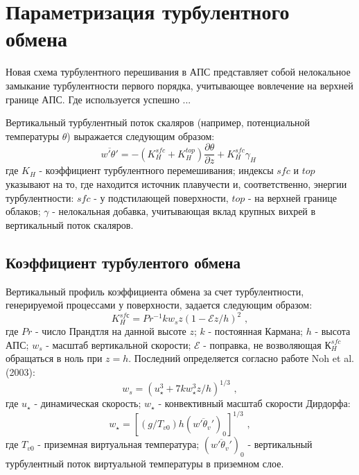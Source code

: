 \documentclass[12pt]{article}
\begin{document}
\section{Параметризация турбулентного обмена}

Новая схема турбулентного перешивания в АПС представляет собой нелокальное замыкание турбулентности первого порядка, учитывающее вовлечение на верхней границе АПС. Где используется успешно ...

Вертикальный турбулентный поток скаляров (например, потенциальной температуры $\theta$) выражается следующим образом:
%
\begin{equation}
\overline{w'\theta'} = - \left ( K_H^{sfc} + K_H^{top} \right ) \frac{\partial \theta}{\partial z} + K_H^{sfc} \gamma_{H} \,\,
\end{equation}
%
где $K_H$ - коэффициент турбулентного перемешивания; индексы $sfc$ и $top$ указывают на то, где находится источник плавучести и, соответственно, энергии турбулентности: $sfc$ - у подстилающей поверхности, $top$ - на верхней границе облаков; $\gamma$ - нелокальная добавка, учитывающая вклад крупных вихрей в вертикальный поток скаляров.

\subsection{Коэффициент турбулентого обмена}
 Вертикальный профиль коэффициента обмена за счет турбулентности, генерируемой процессами у поверхности, задается следующим образом:
%
\begin{equation}
K_{H}^{sfс} = Pr^{-1}kw_sz(1- \mathcal{E} z/h)^2 \,\, ,
\end{equation}
%
где $Pr$ - число Прандтля на данной высоте $z$; $k$ - постоянная Кармана; $h$ - высота АПС; $w_s$ - масштаб вертикальной скорости; $\mathcal{E}$ - поправка, не возволяющая $К_H^{sfc}$ обращаться в ноль при $z = h$. Последний определяется согласно работе Noh et al. (2003):
%
\begin{equation}
w_s = (u_{\star}^3 + 7kw_{\star}^3z/h)^{1/3} \,\, ,
\end{equation}
%
где $u_{\star}$ - динамическая скорость; $w_{\star}$ - конвективный масштаб скорости Дирдорфа:
%
\begin{equation}
w_{\star} = [(g/T_{v0})h(\overline{w'\theta_v'})_0]^{1/3} \,\, ,
\end{equation}
%
где $T_{v0}$ - приземная виртуальная температура; $(\overline{w'\theta_v'})_0$ - вертикальный турбулентный поток виртуальной температуры в приземном слое.
\end{document}
